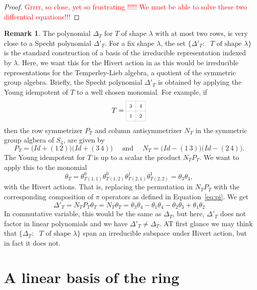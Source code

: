 \documentclass[11pt]{amsart}
\theoremstyle{definition}
\newtheorem{remark}[theorem]{Remark}
\numberwithin{equation}{section}
\begin{document}
\begin{proof}
  \textcolor{red}{Grrrr, so close, yet so frustrating !!!!! We must be able to solve these two differntial equations!!!}
  
\end{proof}

\begin{remark} The polynomial $\Delta_T$ for $T$ of shape $\lambda$ with at most two rows, is very close to a Specht polynomial $\Delta'_T$.
For a fix shape $\lambda$, the set $\{\Delta'_T: \text{ $T$ of shape $\lambda$}\}$ is the standard construction of a basis of the irreducible representation indexed by $\lambda$. Here, we want this for the Hivert action in \cite{H} as this would be irreducible representations for the Temperley-Lieb algebra, a quotient of the symmetric group algebra. Briefly, the Specht polynomial $\Delta'_T$ is obtained by applying the Young idempotent of $T$ to a well chosen monomial. For example, if
$$ T=
\begin{tikzpicture}[scale=0.5,baseline=12pt] 
	\draw[help lines] (0,0) grid (2,2);
	\node at (.5,.5){$\scriptstyle 1$};
	\node at (.5,1.5){$\scriptstyle 3$};
	\node at (1.5,.5){$\scriptstyle 2$};
	\node at (1.5,1.5){$\scriptstyle 4$};
\end{tikzpicture}\,
$$
then the  row symmetrizer $P_T$ and column antisymmetrizer $N_T$ in the symmetric group algbera of $S_4$, are given by
$$
P_T= \big( Id + (1\, 2)\big)\big( Id + (3\, 4)\big)\quad\text{ and }\quad N_T= \big( Id - (1\, 3)\big)\big( Id - (2\, 4)\big).
$$
The Young idempotent for $T$ is up to a scalar the product $N_TP_T$. We want to apply this to the monomial 
$$\theta_T=\theta_{T(1,1)}^0\theta_{T(1,2)}^0\theta_{T(2,1)}^1\theta_{T(2,2)}^1= \theta_3\theta_4,
$$
with the Hivert actions. That is, replacing the permutation in $N_TP_T$ with the corresponding composition of $\pi$ operators as defined in Equation~\eqref{eq:pi}.
We get
 $$ \Delta'_T=N_TP_T\theta_T = N_T \theta_T =  \theta_3\theta_4 -  \theta_1\theta_4 -  \theta_2\theta_3 +  \theta_1\theta_2
 $$
 In commutative variable, this would be the same as $\Delta_T$, but here, $ \Delta'_T$ does not factor in linear polynomials and we have $ \Delta'_T\ne \Delta_T$.
 AT first glance we may think that $\{\Delta_T: \text{ $T$ of shape $\lambda$}\}$ span an irreducible subspace under Hivert action, but in fact it does not.
\end{remark}


\section{A linear basis of the ring}
\end{document}
